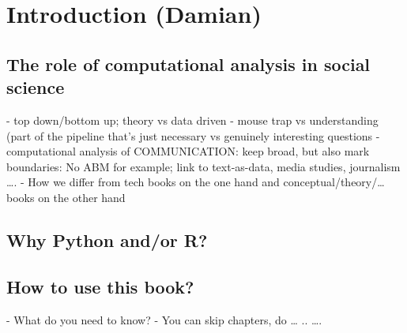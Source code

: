\chapter{Introduction (Damian)}
\label{chap:introduction}


\section{The role of computational analysis in social science}


- top down/bottom up; theory vs data driven
- mouse trap vs understanding (part of the pipeline that’s just necessary vs genuinely interesting questions
- computational analysis of COMMUNICATION: keep broad, but also mark boundaries: No ABM for example; link to text-as-data, media studies, journalism ….
- How we differ from tech books on the one hand and conceptual/theory/… books on the other hand

\section{Why Python and/or R?}


\section{How to use this book?}

- What do you need to know?
- You can skip chapters, do … .. ….


